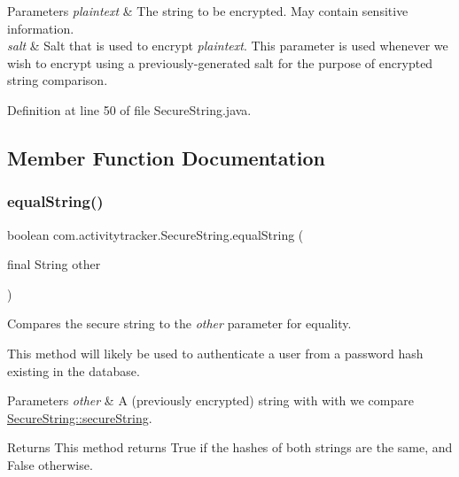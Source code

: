 \begin{DoxyParams}{Parameters}
{\em plaintext} & The string to be encrypted. May contain sensitive information. \\
\hline
{\em salt} & Salt that is used to encrypt {\itshape plaintext}. This parameter is used whenever we wish to encrypt using a previously-\/generated salt for the purpose of encrypted string comparison. \\
\hline
\end{DoxyParams}


Definition at line 50 of file Secure\+String.\+java.



\subsection{Member Function Documentation}
\mbox{\label{classcom_1_1activitytracker_1_1_secure_string_a8b5c3cac74b22ff0eb3c43a7ebd980f5}} 
\subsubsection{\texorpdfstring{equal\+String()}{equalString()}}
{\footnotesize\ttfamily boolean com.\+activitytracker.\+Secure\+String.\+equal\+String (\begin{DoxyParamCaption}\item[{final String}]{other }\end{DoxyParamCaption})}

Compares the secure string to the {\itshape other} parameter for equality.

This method will likely be used to authenticate a user from a password hash existing in the database.


\begin{DoxyParams}{Parameters}
{\em other} & A (previously encrypted) string with with we compare \mbox{\hyperlink{classcom_1_1activitytracker_1_1_secure_string_a1448f7b8865c6c57cc7218662ee7f1ee}{Secure\+String\+::secure\+String}}.\\
\hline
\end{DoxyParams}
\begin{DoxyReturn}{Returns}
This method returns True if the hashes of both strings are the same, and False otherwise. 
\end{DoxyReturn}


